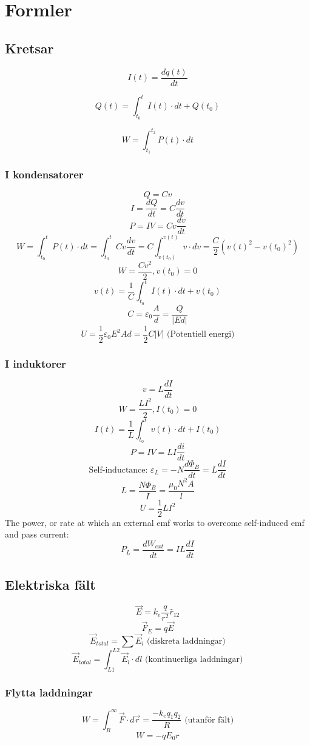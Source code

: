 \documentclass{article}
\begin{document}
 \newpage
\section{Formler}
\subsection{Kretsar}
\[ I(t) = \frac{dq(t)}{dt} \]

\[ Q(t) = \int_{t_0}^t I(t) \cdot dt + Q(t_0) \]

\[ W = \int_{t_1}^{t_2} P(t) \cdot dt \]

\subsubsection{I kondensatorer}
\[ Q = Cv \]
\[ I = \frac{dQ}{dt} = C \frac{dv}{dt} \]
\[ P = IV = Cv \frac{dv}{dt} \]
\[ W = \int_{t_0}^t P(t) \cdot dt = \int_{t_0}^t Cv \frac{dv}{dt} = C \int_{v(t_0)}^{v(t)} v \cdot dv = \frac{C}{2}(v(t)^2 - v(t_0)^2) \]
\[ W = \frac{Cv^2}{2}, v(t_0) = 0 \]
\[ v(t) = \frac{1}{C} \int_{t_0}^t I(t)\cdot dt + v(t_0) \]
\[ C = \varepsilon_0 \frac{A}{d} = \frac{Q}{|Ed|} \]
\[ U = \frac{1}{2} \varepsilon_0 E^2Ad = \frac{1}{2} C |V| \textrm{ (Potentiell energi)} \]

\subsubsection{I induktorer}
\[ v = L \frac{dI}{dt} \]
\[ W = \frac{LI^2}{2}, I(t_0) = 0 \]
\[ I(t) = \frac{1}{L} \int_{t_0}^t v(t) \cdot dt + I(t_0) \]
\[ P = IV = LI \frac{di}{dt} \]
\[ \textrm{Self-inductance: } \varepsilon_L = -N \frac{d\Phi_B}{dt} = L \frac{dI}{dt} \]
\[ L = \frac{N \Phi_B}{I} = \frac{\mu_0 N^2 A}{l} \]
\[ U = \frac{1}{2} LI^2 \]
The power, or rate at which an external emf works to overcome self-induced emf and pass current: \[ P_L = \frac{dW_{ext}}{dt} = IL\frac{dI}{dt} \]

\subsection{Elektriska fält}
\[ \vec{E} = k_e \frac{q}{r^2} \hat{r}_{12} \]
\[ \vec{F}_E  = q \vec{E} \]
\[ \vec{E}_{total} = \sum \vec{E}_i \textrm{ (diskreta laddningar)} \]
\[ \vec{E}_{total} = \int_{L1}^{L2} \vec{E}_l \cdot dl \textrm{ (kontinuerliga laddningar)} \]

\subsubsection{Flytta laddningar}
\[ W =\int_R^{\infty} \vec{F} \cdot d\vec{r} = \frac{-k_eq_1q_2}{R} \textrm{ (utanför fält)} \]
\[ W = -qE_0r \]
\end{document}
